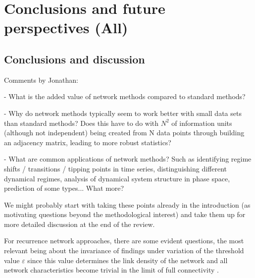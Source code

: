 \section{Conclusions and future perspectives {\bf{(All)}}} \label{sec:Discussion}
	\subsection{Conclusions and discussion}
Comments by Jonathan:

- What is the added value of network methods compared to standard methods?

- Why do network methods typically seem to work better with small data sets than standard methods? Does this have to do with $N^2$ of information units (although not independent) being created from N data points through building an adjacency matrix, leading to more robust statistics?

- What are common applications of network methods? Such as identifying regime shifts / transitions / tipping points in time series, distinguishing different dynamical regimes, analysis of dynamical system structure in phase space, prediction of some types... What more?

We might probably start with taking these points already in the introduction (as motivating questions beyond the methodological interest) and take them up for more detailed discussion at the end of the review.

For recurrence network approaches, there are some evident questions, the most relevant being about the invariance of findings under variation of the threshold value $\varepsilon$ since this value determines the link density of the network and all network characteristics become trivial in the limit of full connectivity \cite{Bradley2015c}.

